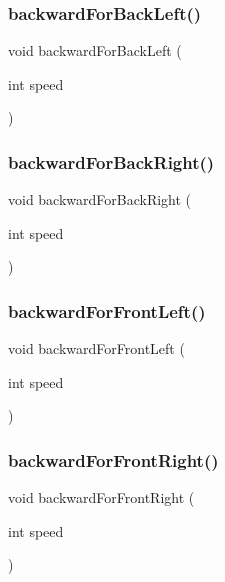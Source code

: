 \subsubsection{\texorpdfstring{backward\+For\+Back\+Left()}{backwardForBackLeft()}}
{\footnotesize\ttfamily void backward\+For\+Back\+Left (\begin{DoxyParamCaption}\item[{int}]{speed }\end{DoxyParamCaption})}

\mbox{\label{car_8ino_a132295235efc0d707c2e34134af320d4}} 
\subsubsection{\texorpdfstring{backward\+For\+Back\+Right()}{backwardForBackRight()}}
{\footnotesize\ttfamily void backward\+For\+Back\+Right (\begin{DoxyParamCaption}\item[{int}]{speed }\end{DoxyParamCaption})}

\mbox{\label{car_8ino_af1ff7cc133f26792314dc587d391a2e9}} 
\subsubsection{\texorpdfstring{backward\+For\+Front\+Left()}{backwardForFrontLeft()}}
{\footnotesize\ttfamily void backward\+For\+Front\+Left (\begin{DoxyParamCaption}\item[{int}]{speed }\end{DoxyParamCaption})}

\mbox{\label{car_8ino_a9303a11d73ff753cab62587a431ad893}} 
\subsubsection{\texorpdfstring{backward\+For\+Front\+Right()}{backwardForFrontRight()}}
{\footnotesize\ttfamily void backward\+For\+Front\+Right (\begin{DoxyParamCaption}\item[{int}]{speed }\end{DoxyParamCaption})}

